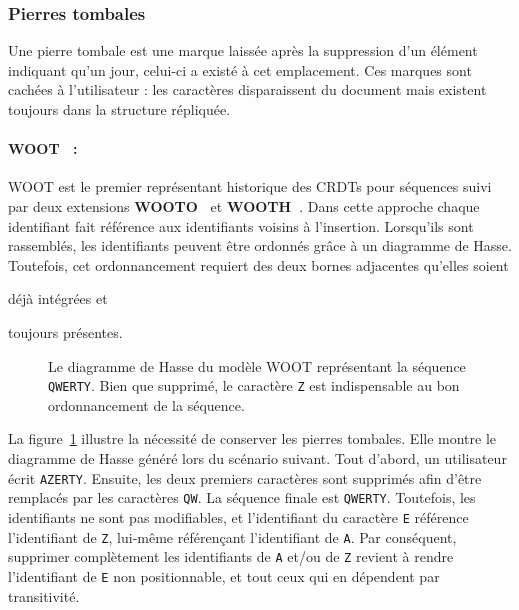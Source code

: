 \subsubsection{Pierres tombales}
\label{repl:subsubsec:tombstones}

Une \og pierre tombale \fg est une marque laissée après la suppression d'un
élément indiquant qu'un jour, celui-ci a existé à cet emplacement. Ces marques
sont cachées à l'utilisateur : les caractères disparaissent du document mais
existent toujours dans la structure répliquée.


\paragraph{WOOT~\cite{oster2006data} :} WOOT est le premier représentant
historique des CRDTs pour séquences suivi par deux extensions
\textbf{WOOTO~\cite{weiss2007wooki}} et
\textbf{WOOTH~\cite{ahmed2011evaluating}}. Dans cette approche chaque
identifiant fait référence aux identifiants voisins à l'insertion.  Lorsqu'ils
sont rassemblés, les identifiants peuvent être ordonnés grâce à un diagramme de
Hasse. Toutefois, cet ordonnancement requiert des deux bornes adjacentes
qu'elles soient
\begin{inparaenum}[(i)]
\item déjà intégrées et
\item toujours présentes.
\end{inparaenum}

\begin{figure}
  \centering
  
  \caption[Diagramme de Hasse dans WOOT]
  {\label{repl:fig:wootexample}Le diagramme de Hasse du modèle WOOT représentant
    la séquence \texttt{QWERTY}. Bien que supprimé, le caractère \texttt{Z} est
    indispensable au bon ordonnancement de la séquence.}
\end{figure}

\noindent La figure~\ref{repl:fig:wootexample} illustre la nécessité de
conserver les pierres tombales. Elle montre le diagramme de Hasse généré lors du
scénario suivant. Tout d'abord, un utilisateur écrit \texttt{AZERTY}. Ensuite,
les deux premiers caractères sont supprimés afin d'être remplacés par les
caractères \texttt{QW}. La séquence finale est \texttt{QWERTY}. Toutefois, les
identifiants ne sont pas modifiables, et l'identifiant du caractère \texttt{E}
référence l'identifiant de \texttt{Z}, lui-même référençant l'identifiant de
\texttt{A}. Par conséquent, supprimer complètement les identifiants de
\texttt{A} et/ou de \texttt{Z} revient à rendre l'identifiant de \texttt{E} non
positionnable, et tout ceux qui en dépendent par transitivité.


